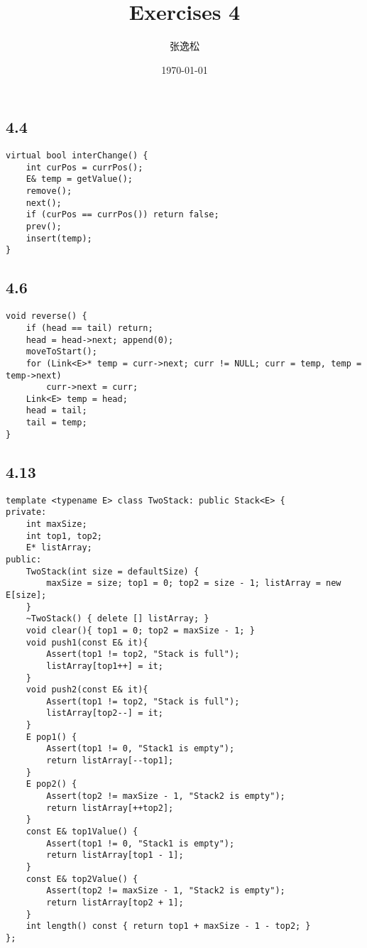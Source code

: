 \documentclass[12pt]{ctexart}
\title{Exercises 4}
\author{张逸松}
\date{\today}
\begin{document}
    \maketitle
    \subsection*{4.4}
    \begin{lstlisting}
virtual bool interChange() {
    int curPos = currPos();
    E& temp = getValue();
    remove();
    next();
    if (curPos == currPos()) return false;
    prev();
    insert(temp);
}
    \end{lstlisting}

    \subsection*{4.6}
    \begin{lstlisting}
void reverse() {
    if (head == tail) return;
    head = head->next; append(0);
    moveToStart();
    for (Link<E>* temp = curr->next; curr != NULL; curr = temp, temp = temp->next)
        curr->next = curr;
    Link<E> temp = head;
    head = tail;
    tail = temp;
}
    \end{lstlisting}

    \subsection*{4.13}
    \begin{lstlisting}
template <typename E> class TwoStack: public Stack<E> {
private:
    int maxSize;
    int top1, top2;
    E* listArray;
public:
    TwoStack(int size = defaultSize) {
        maxSize = size; top1 = 0; top2 = size - 1; listArray = new E[size];
    }
    ~TwoStack() { delete [] listArray; }
    void clear(){ top1 = 0; top2 = maxSize - 1; }
    void push1(const E& it){
        Assert(top1 != top2, "Stack is full");
        listArray[top1++] = it;
    }
    void push2(const E& it){
        Assert(top1 != top2, "Stack is full");
        listArray[top2--] = it;
    }
    E pop1() {
        Assert(top1 != 0, "Stack1 is empty");
        return listArray[--top1];
    }
    E pop2() {
        Assert(top2 != maxSize - 1, "Stack2 is empty");
        return listArray[++top2];
    }
    const E& top1Value() {
        Assert(top1 != 0, "Stack1 is empty");
        return listArray[top1 - 1];
    }
    const E& top2Value() {
        Assert(top2 != maxSize - 1, "Stack2 is empty");
        return listArray[top2 + 1];
    }
    int length() const { return top1 + maxSize - 1 - top2; }
};
    \end{lstlisting}
\end{document}
